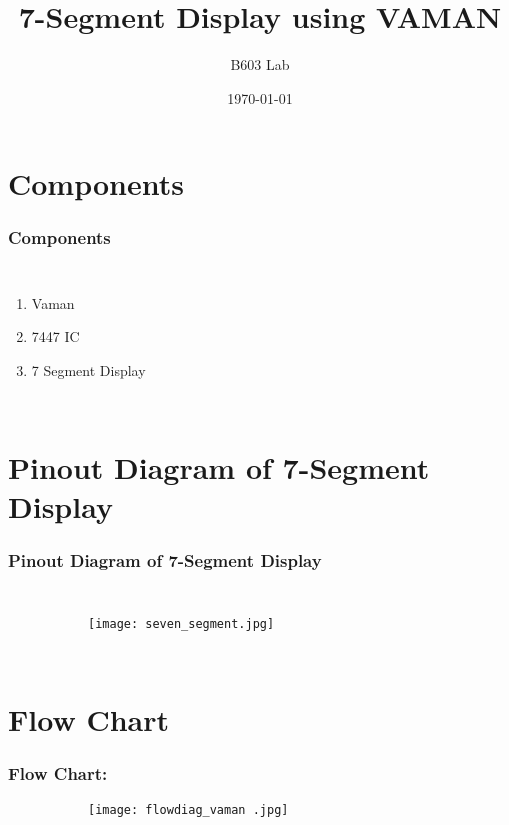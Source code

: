 \documentclass{beamer}
\title{7-Segment Display using VAMAN}
\author{B603 Lab}
\institute{Indian Institute of Technology, Hyderabad.}
\date{\today}
\begin{document}
\begin{frame}
\titlepage
\end{frame}


\section{Components}
\begin{frame}
\frametitle{Components}
\begin{columns}
  \begin{enumerate}
  \item Vaman
  \vspace{10pt}
  \item 7447 IC
  \vspace{10pt}
  \item 7 Segment Display
  
  
  \end{enumerate}
  
\end{columns}

\end{frame}

\section{Pinout Diagram of 7-Segment Display}
\begin{frame}
\frametitle{Pinout Diagram of 7-Segment Display}
\begin{columns}
\begin{figure}[h!]
  \centering
  \begin{subfigure}[b]{0.75\linewidth}
    \texttt{[image: seven\_segment.jpg]}
  \end{subfigure}

\end{figure}



  
\end{columns}



\end{frame}

\section{Flow Chart }
\begin{frame}
\frametitle{Flow Chart: }
\begin{figure}[h!]
  \centering
  \begin{subfigure}[b]{0.75\linewidth}
    \texttt{[image: flowdiag\_vaman .jpg]}
  \end{subfigure}


\end{figure}




\end{frame}
\end{document}
